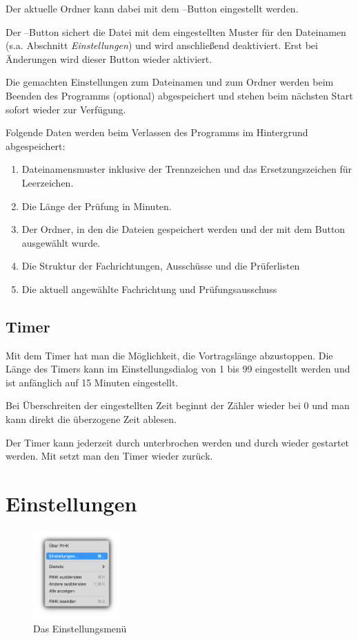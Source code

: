 \documentclass[a4paper,notitlepage,parskip=half]{scrartcl}
\begin{document}
Der aktuelle Ordner kann dabei mit dem --Button eingestellt werden.

Der --Button sichert die Datei mit dem eingestellten Muster für den Dateinamen (s.a. Abschnitt \emph{Einstellungen}) und wird anschließend deaktiviert. Erst bei Änderungen wird dieser Button wieder aktiviert.

Die gemachten Einstellungen zum Dateinamen und zum Ordner werden beim Beenden des Programms (optional) abgespeichert und stehen beim nächsten Start sofort wieder zur Verfügung.

Folgende Daten werden beim Verlassen des Programms im Hintergrund abgespeichert:
\begin{enumerate}
\item Dateinamensmuster inklusive der Trennzeichen und das Ersetzungszeichen für Leerzeichen.
\item Die Länge der Prüfung in Minuten.
\item Der Ordner, in den die Dateien gespeichert werden und der mit dem  Button ausgewählt wurde.
\item Die Struktur der Fachrichtungen, Ausschüsse und die Prüferlisten
\item Die aktuell angewählte Fachrichtung und Prüfungsausschuss
\end{enumerate}
 
\subsection{Timer}
Mit dem Timer hat man die Möglichkeit, die Vortragslänge abzustoppen.
Die Länge des Timers kann im Einstellungsdialog von 1 bis 99 eingestellt werden und ist anfänglich auf 15 Minuten eingestellt.

Bei Überschreiten der eingestellten Zeit beginnt der Zähler wieder bei 0 und man kann direkt die überzogene Zeit ablesen.

Der Timer kann jederzeit durch  unterbrochen werden und durch  wieder gestartet werden. Mit  setzt man den Timer wieder zurück.

\section{Einstellungen}
\label{sec:einstellungen}
\begin{figure}[ht]
  \centering
  \includegraphics[width=0.3\textwidth]{menu0.png}
  \caption{Das Einstellungsmenü}
  \label{fig:menu}
\end{figure}
\end{document}
